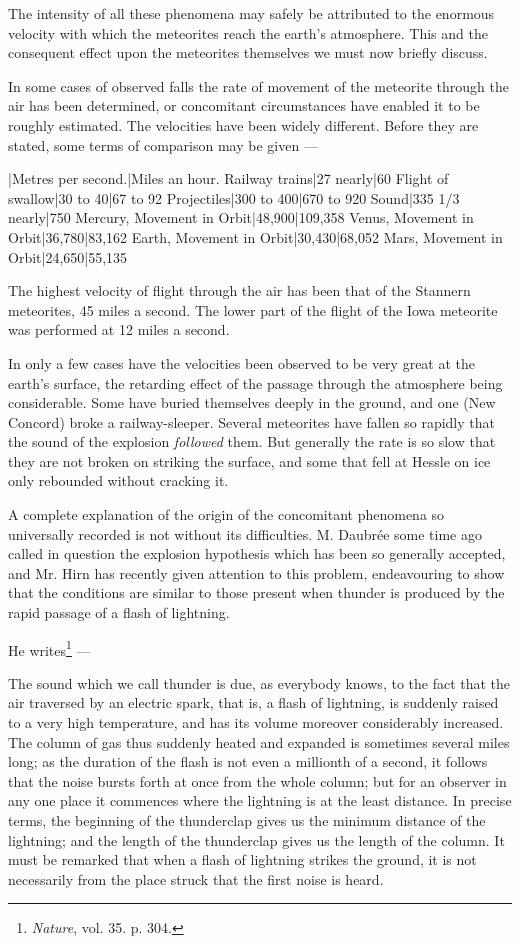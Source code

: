 \documentclass[a4paper, 12pt, oneside, polutonikogreek, english]{article}
\begin{document}
The intensity of all these phenomena may safely be attributed to the enormous velocity with which the meteorites reach the earth's atmosphere. This and the consequent effect upon the meteorites themselves we must now briefly discuss.

In some cases of observed falls the rate of movement of the meteorite through the air has been determined, or concomitant circumstances have enabled it to be roughly estimated. The velocities have been widely different. Before they are stated, some terms of comparison may be given ---

|Metres per second.|Miles an hour. 
Railway trains|27 nearly|60 
Flight of swallow|30 to 40|67 to 92 
Projectiles|300 to 400|670 to 920 
Sound|335 1/3 nearly|750 
Mercury, Movement in Orbit|48,900|109,358 
Venus, Movement in Orbit|36,780|83,162 
Earth, Movement in Orbit|30,430|68,052 
Mars, Movement in Orbit|24,650|55,135 

The highest velocity of flight through the air has been that of the Stannern meteorites, 45 miles a second. The lower part of the flight of the Iowa meteorite was performed at 12 miles a second.

In only a few cases have the velocities been observed to be very great at the earth's surface, the retarding effect of the passage through the atmosphere being considerable. Some have buried themselves deeply in the ground, and one (New Concord) broke a railway-sleeper. Several meteorites have fallen so rapidly that the sound of the explosion \emph{followed} them. But generally the rate is so slow that they are not broken on striking the surface, and some that fell at Hessle on ice only rebounded without cracking it.

A complete explanation of the origin of the concomitant phenomena so universally recorded is not without its difficulties. M. Daubrée some time ago called in question the explosion hypothesis which has been so generally accepted, and Mr. Hirn has recently given attention to this problem, endeavouring to show that the conditions are similar to those present when thunder is produced by the rapid passage of a flash of lightning.

He writes\footnote{\emph{Nature}, vol. 35. p. 304.} ---

The sound which we call thunder is due, as everybody knows, to the fact that the air traversed by an electric spark, that is, a flash of lightning, is suddenly raised to a very high temperature, and has its volume moreover considerably increased. The column of gas thus suddenly heated and expanded is sometimes several miles long; as the duration of the flash is not even a millionth of a second, it follows that the noise bursts forth at once from the whole column; but for an observer in any one place it commences where the lightning is at the least distance. In precise terms, the beginning of the thunderclap gives us the minimum distance of the lightning; and the length of the thunderclap gives us the length of the column. It must be remarked that when a flash of lightning strikes the ground, it is not necessarily from the place struck that the first noise is heard.
\end{document}
